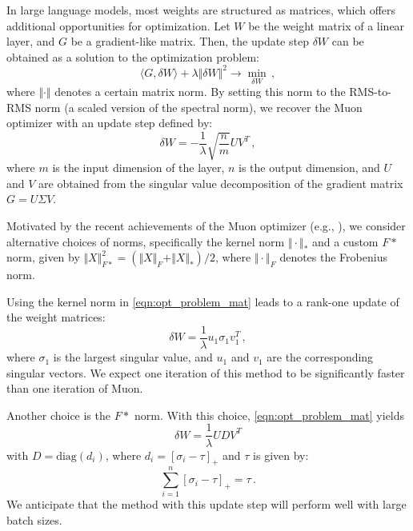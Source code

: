 \documentclass[]{scrartcl}
\newcommand{\norm}[1]{\Vert{#1}\Vert}
\begin{document}
In large language models, most weights are structured as matrices, which offers additional opportunities for optimization. Let $W$ be the weight matrix of a linear layer, and $G$ be a gradient-like matrix. Then, the update step $\delta W$ can be obtained as a solution to the optimization problem:
\begin{equation}\label{eqn:opt_problem_mat}
  \langle G, \delta W \rangle + \lambda \norm{\delta W}^2 \to \min_{\delta W}\,,
\end{equation}
where $\norm{\cdot}$ denotes a certain matrix norm. By setting this norm to the RMS-to-RMS norm (a scaled version of the spectral norm), we recover the Muon optimizer \cite{bernstein2025deriving, bernstein2024oldoptimizernewnorm} with an update step defined by:
\begin{equation}
\delta W = - \frac{1}{\lambda}\sqrt{\frac{n}{m}}UV^T\,,
\end{equation}
where $m$ is the input dimension of the layer, $n$ is the output dimension, and $U$ and $V$ are obtained from the singular value decomposition of the gradient matrix $G = U \Sigma V$.

Motivated by the recent achievements of the Muon optimizer (e.g., \cite{liu2025muon}), we consider alternative choices of norms, specifically the kernel norm $\norm{\cdot}_*$ and a custom $F*$ norm, given by $\norm{X}_{F*}^2 = (\norm{X}_F + \norm{X}_*)/2$, where $\norm{\cdot}_F$ denotes the Frobenius norm.

Using the kernel norm in \eqref{eqn:opt_problem_mat} leads to a rank-one update of the weight matrices:
\begin{equation}\label{eqn:update_star}
  \delta W = \frac{1}{\lambda} u_1 \sigma_1 v_1^T\,,
\end{equation}
where $\sigma_1$ is the largest singular value, and $u_1$ and $v_1$ are the corresponding singular vectors. We expect one iteration of this method to be significantly faster than one iteration of Muon.

Another choice is the $F*$ norm. With this choice, \eqref{eqn:opt_problem_mat} yields 
\begin{equation}\label{eqn:update_F_star}
\delta W = \frac{1}{\lambda}UDV^T
\end{equation} 
with $D = \text{diag}(d_i)$, where $d_i = [\sigma_i - \tau]_+$ and $\tau$ is given by:
\begin{equation}
    \sum_{i=1}^n [\sigma_i - \tau]_+ = \tau\,.
\end{equation}
We anticipate that the method with this update step will perform well with large batch sizes.
\end{document}
